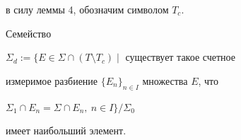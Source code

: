 в силу леммы 4, обозначим символом $T_c$.





\begin{lem}


Семейство


$\Sigma_d:=\{E\in\Sigma\cap(T\setminus T_c)\mid$ существует такое счетное


измеримое разбиение $\{E_n\}_{n\in I}$ множества $E$, что


$\Sigma_1\cap E_n=\Sigma\cap E_n,\ n\in I\}/\Sigma_0$


имеет наибольший элемент.


\end{lem}





